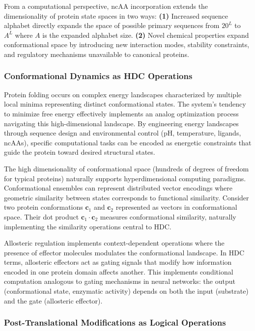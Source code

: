 \documentclass[12pt]{article}
\begin{document}
From a computational perspective, ncAA incorporation extends the dimensionality of protein state spaces in two ways: \textbf{(1)} Increased sequence alphabet directly expands the space of possible primary sequences from $20^L$ to $A^L$ where $A$ is the expanded alphabet size. \textbf{(2)} Novel chemical properties expand conformational space by introducing new interaction modes, stability constraints, and regulatory mechanisms unavailable to canonical proteins.

\subsubsection{Conformational Dynamics as HDC Operations}

Protein folding occurs on complex energy landscapes characterized by multiple local minima representing distinct conformational states. The system's tendency to minimize free energy effectively implements an analog optimization process navigating this high-dimensional landscape. By engineering energy landscapes through sequence design and environmental control (pH, temperature, ligands, ncAAs), specific computational tasks can be encoded as energetic constraints that guide the protein toward desired structural states.

The high dimensionality of conformational space (hundreds of degrees of freedom for typical proteins) naturally supports hyperdimensional computing paradigms. Conformational ensembles can represent distributed vector encodings where geometric similarity between states corresponds to functional similarity. Consider two protein conformations $\mathbf{c}_1$ and $\mathbf{c}_2$ represented as vectors in conformational space. Their dot product $\mathbf{c}_1 \cdot \mathbf{c}_2$ measures conformational similarity, naturally implementing the similarity operations central to HDC.

Allosteric regulation implements context-dependent operations where the presence of effector molecules modulates the conformational landscape. In HDC terms, allosteric effectors act as gating signals that modify how information encoded in one protein domain affects another. This implements conditional computation analogous to gating mechanisms in neural networks: the output (conformational state, enzymatic activity) depends on both the input (substrate) and the gate (allosteric effector).

\subsubsection{Post-Translational Modifications as Logical Operations}
\end{document}

